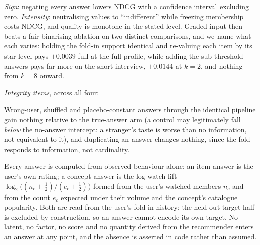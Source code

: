 \documentclass[acmsmall,review,anonymous]{acmart}
\begin{document}
\begin{description}[leftmargin=2.4em,itemsep=1.5pt]
  \item[R4, expressive answers.] \emph{Sign}: negating every answer lowers NDCG with a confidence interval excluding zero. \emph{Intensity}: neutralising values to ``indifferent'' while freezing membership costs NDCG, and quality is monotone in the stated level. Graded input then beats a fair binarising ablation on two distinct comparisons, and we name what each varies: holding the fold-in support identical and re-valuing each item by its star level pays $+0.0039$ full at the full profile, while adding the sub-threshold answers pays far more on the short interview, $+0.0144$ at $k{=}2$, and nothing from $k{=}8$ onward.
\end{description}

\noindent\emph{Integrity items}, across all four:
\begin{description}[leftmargin=2.4em,itemsep=1.5pt]
  \item[Existential controls.] Wrong-user, shuffled and placebo-constant answers through the identical pipeline gain nothing relative to the true-answer arm (a control may legitimately fall \emph{below} the no-answer intercept: a stranger's taste is worse than no information, not equivalent to it), and duplicating an answer changes nothing, since the fold responds to information, not cardinality.
  \item[No recommender geometry in answers.] Every answer is computed from observed behaviour alone: an item answer is the user's own rating; a concept answer is the log watch-lift $\log_2\!\big((n_c+\tfrac12)/(e_c+\tfrac12)\big)$ formed from the user's watched members $n_c$ and from the count $e_c$ expected under their volume and the concept's catalogue popularity. Both are read from the user's fold-in history; the held-out target half is excluded by construction, so an answer cannot encode its own target. No latent, no factor, no score and no quantity derived from the recommender enters an answer at any point, and the absence is asserted in code rather than assumed.
\end{description}
\end{document}
